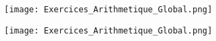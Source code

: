 \documentclass{exos}
\begin{document}
\begin{center}
\texttt{[image: Exercices\_Arithmetique\_Global.png]}
  
\vspace*{2cm}
\texttt{[image: Exercices\_Arithmetique\_Global.png]}
\end{center}
\end{document}
